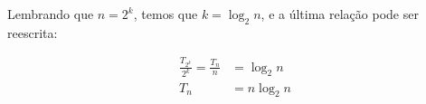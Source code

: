 Lembrando que $n=2^{k}$, temos que $k=\log_{2}n$, e a última relação pode ser reescrita:

\begin{align*}
 \frac{T_{2^{k}}}{2^{k}} = \frac{T_{n}}{n} &= \log_{2} n \\
 T_{n} &= n \log_{2} n \tag*{(Q.E.D.)}
\end{align*}

